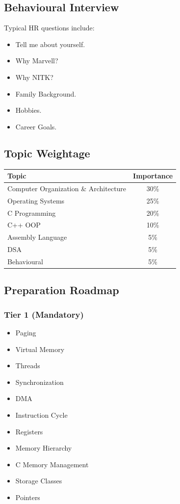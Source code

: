 \documentclass[11pt,a4paper]{article}
\begin{document}
\subsection{Behavioural Interview}

Typical HR questions include:

\begin{itemize}
	\item Tell me about yourself.
	\item Why Marvell?
	\item Why NITK?
	\item Family Background.
	\item Hobbies.
	\item Career Goals.
\end{itemize}


\subsection{Topic Weightage}

\begin{center}
	\begin{tabular}{|l|c|}
		\hline
		Topic & Importance \\
		\hline
		Computer Organization \& Architecture & 30\% \\
		Operating Systems & 25\% \\
		C Programming & 20\% \\
		C++ OOP & 10\% \\
		Assembly Language & 5\% \\
		DSA & 5\% \\
		Behavioural & 5\% \\
		\hline
	\end{tabular}
\end{center}


\subsection{Preparation Roadmap}

\subsubsection{Tier 1 (Mandatory)}

\begin{itemize}
	\item Paging
	\item Virtual Memory
	\item Threads
	\item Synchronization
	\item DMA
	\item Instruction Cycle
	\item Registers
	\item Memory Hierarchy
	\item C Memory Management
	\item Storage Classes
	\item Pointers
\end{itemize}
\end{document}

